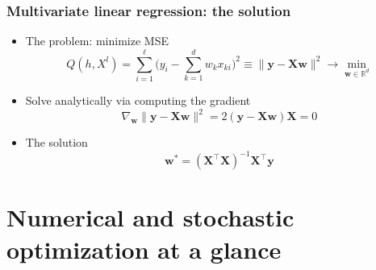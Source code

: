 \documentclass[usenames,dvipsnames,aspectratio=169]{beamer}
\begin{document}
\begin{frame}
\frametitle{Multivariate linear regression: the solution}

\begin{itemize}

\item The problem: minimize MSE
\[
Q(h, X^{l}) = 
  \sum\limits_{i=1}^{\ell} 
  \big(y_i - \sum\limits_{k=1}^d w_k x_{ki}\big)^2
\equiv
\lVert \bm{y} - \bm{X} \mathbf{w}  \rVert^2 \to 
  \min_{\mathbf{w} \in \mathbb{R}^d}
\]

\pause
\item Solve analytically via computing the gradient
\[
\nabla_{\mathbf{w}} \lVert \bm{y} - \bm{X} \mathbf{w} \rVert^2
=
2 (\bm{y} - \bm{X}\mathbf{w})\bm{X} = 0
\]

\pause
\item The solution
\[
\mathbf{w}^* = ( \bm{X}^{\intercal} \bm{X} )^{-1} \bm{X}^{\intercal} \bm{y}
\]

\end{itemize}

\end{frame}



\section{Numerical and stochastic optimization at a glance}
\end{document}
